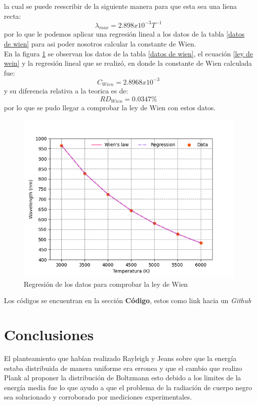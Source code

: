 \documentclass[12pt,letterpaper]{article}
\begin{document}
\begin{multicols}{2}
la cual se puede reescribir de la siguiente manera para que esta sea una liena recta:
\begin{equation}
    \lambda_{max} = 2.898x10^{-3} T^{-1}
\end{equation}
por lo que le podemos aplicar una regresión lineal a los datos de la tabla \ref{datos de wien} para asi poder nosotros calcular la constante de Wien.\\
En la figura \ref{wienfig} se observan los datos de la tabla \ref{datos de wien}, el ecuación \ref{ley de wein} y la regresión lineal que se realizó, en donde la constante de Wien calculada fue:
\begin{equation*}
    C_{Wien}= 2.8968x10^{-3}
\end{equation*}
y su diferencia relativa a la teorica es de:
\begin{equation*}
    RD_{Wien}= 0.0347 \%
\end{equation*}
por lo que se pudo llegar a comprobar la ley de Wien con estos datos.
\begin{figure}[H]
\includegraphics[scale=0.45]{../Graphics/wien_law.png}
\caption{Regresión de los datos para comprobar la ley de Wien}
\label{wienfig}
\end{figure}
Los códigos se encuentran en la sección \textbf{Código}, estos como link hacia un \textit{Github}
\section*{Conclusiones}
El planteamiento que habían realizado Rayleigh y Jeans sobre que la energía estaba distribuida de manera uniforme era erronea y que el cambio que realizo Plank al proponer la distribución de Boltzmann esto debido a los limites de la energía media fue lo que ayudo a que el problema de la radiación de cuerpo negro sea solucionado y corroborado por mediciones experimentales.

\end{multicols}
\end{document}
